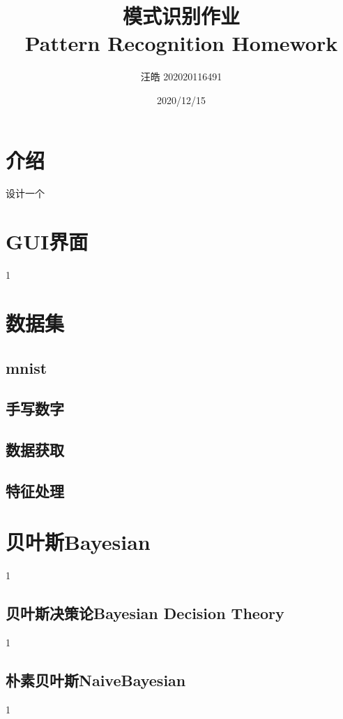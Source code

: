 \documentclass[UTF8, a4paper, 12pt]{report}
\title{模式识别作业\\Pattern Recognition Homework}
\author{汪皓 202020116491}
\date{2020/12/15}
\begin{document}
\maketitle %
\thispagestyle{empty} %
\clearpage %

\pagestyle{plain} %
\setcounter{page}{1} %
\tableofcontents %
\clearpage

\pagestyle{fancy} %
\setcounter{page}{1} %

\chapter{介绍}
设计一个
\chapter{GUI界面}
1
\chapter{数据集}
	\section{mnist}

	\section{手写数字}

	\section{数据获取}

	\section{特征处理}

\chapter{贝叶斯Bayesian}
1
	\section{贝叶斯决策论Bayesian Decision Theory}
1
	\section{朴素贝叶斯NaiveBayesian}
1
\end{document}
